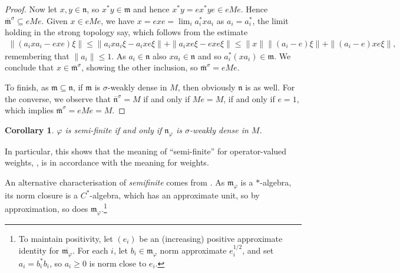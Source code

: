 \documentclass[a4paper,11pt]{article}
\theoremstyle{plain}
\newtheorem{corollary}[proposition]{Corollary}
\theoremstyle{remark}
\newcommand{\mf}[1]{\mathfrak{#1}}
\begin{document}
\begin{proof}
Now let $x,y\in\mf n$, so $x^*y\in\mf m$ and hence $x^*y = ex^*ye \in eMe$.  Hence $\overline{\mf m}^\sigma \subseteq eMe$.  Given $x\in eMe$, we have $x = exe = \lim_i a_i^* x a_i$ as $a_i=a_i^*$, the limit holding in the strong topology say, which follows from the estimate
\begin{align*}
\| (a_ixa_i - exe)\xi \| \leq \| a_ixa_i\xi - a_ixe\xi \| + \| a_ixe\xi -exe\xi\|
\leq \|x\| \|(a_i-e)\xi\| + \| (a_i-e) xe\xi \|,
\end{align*}
remembering that $\|a_i\|\leq 1$.  As $a_i\in\mf n$ also $xa_i\in\mf n$ and so $a_i^* (xa_i) \in \mf m$.  We conclude that $x \in \overline{\mf m}^\sigma$, showing the other inclusion, so $\overline{\mf m}^\sigma = eMe$.

To finish, as $\mf m \subseteq \mf n$, if $\mf m$ is $\sigma$-weakly dense in $M$, then obviously $\mf n$ is as well.  For the converse, we observe that $\overline{\mf n}^\sigma=M$ if and only if $Me=M$, if and only if $e=1$, which implies $\overline{\mf m}^\sigma = eMe = M$.  
\end{proof}

\begin{corollary}
$\varphi$ is semi-finite if and only if $\mf n_\varphi$ is $\sigma$-weakly dense in $M$.
\end{corollary}

In particular, this shows that the meaning of ``semi-finite'' for operator-valued weights, \cite[Definition~IX.4.14]{TakesakiII}, is in accordance with the meaning for weights.

An alternative characterisation of \emph{semifinite} comes from \cite[Proposition~III.2.2.20]{Blackadar_OperatorAlgebrasBook}.  As $\mf m_\varphi$ is a $*$-algebra, its norm closure is a $C^*$-algebra, which has an approximate unit, so by approximation, so does $\mf m_\varphi$.\footnote{To maintain positivity, let $(e_i)$ be an (increasing) positive approximate identity for $\overline{\mf m_\varphi}$.  For each $i$, let $b_i\in\mf m_\varphi$ norm approximate $e_i^{1/2}$, and set $a_i = b_i^*b_i$, so $a_i\geq 0$ is norm close to $e_i$.}
\end{document}
